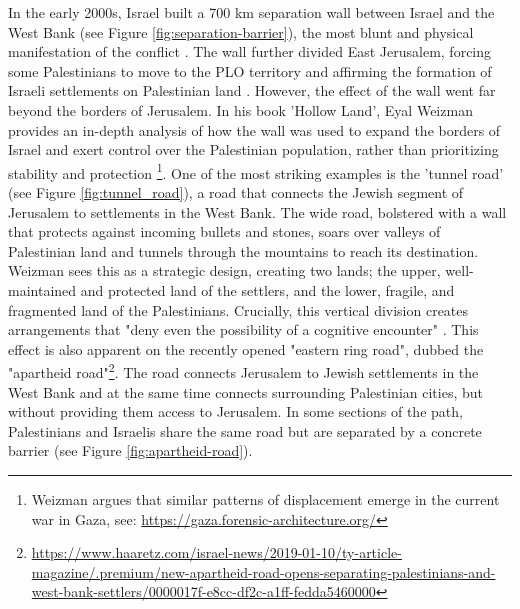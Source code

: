\documentclass[dissertation,math,vertlayout,pdfa,colorlinks,nologo]{aaltoseries}
\begin{document}
In the early 2000s, Israel built a 700 km separation wall between Israel and the West Bank (see Figure \ref{fig:separation-barrier}), the most blunt and physical manifestation of the conflict \cite{weizmanHollowLandIsraels2012}. The wall further divided East Jerusalem, forcing some Palestinians to move to the PLO territory and affirming the formation of Israeli settlements on Palestinian land \cite{kleinJerusalem2022}. However, the effect of the wall went far beyond the borders of Jerusalem. In his book 'Hollow Land', Eyal Weizman provides an in-depth analysis of how the wall was used to expand the borders of Israel and exert control over the Palestinian population, rather than prioritizing stability and protection \cite{weizmanHollowLandIsraels2012}\footnote{Weizman argues that similar patterns of displacement emerge in the current war in Gaza, see: \url{https://gaza.forensic-architecture.org/}}. One of the most striking examples is the 'tunnel road' \cite[p. 179]{weizmanHollowLandIsraels2012} (see Figure \ref{fig:tunnel_road}), a road that connects the Jewish segment of Jerusalem to settlements in the West Bank. The wide road, bolstered with a wall that protects against incoming bullets and stones, soars over valleys of Palestinian land and tunnels through the mountains to reach its destination. Weizman sees this as a strategic design, creating two lands; the upper, well-maintained and protected land of the settlers, and the lower, fragile, and fragmented land of the Palestinians. Crucially, this vertical division creates arrangements that "deny even the possibility of a cognitive encounter" \cite[p. 181]{weizmanHollowLandIsraels2012}. This effect is also apparent on the recently opened "eastern ring road", dubbed the "apartheid road"\footnote{\url{https://www.haaretz.com/israel-news/2019-01-10/ty-article-magazine/.premium/new-apartheid-road-opens-separating-palestinians-and-west-bank-settlers/0000017f-e8cc-df2c-a1ff-fedda5460000}}. The road connects Jerusalem to Jewish settlements in the West Bank and at the same time connects surrounding Palestinian cities, but without providing them access to Jerusalem. In some sections of the path, Palestinians and Israelis share the same road but are separated by a concrete barrier (see Figure \ref{fig:apartheid-road}).
\end{document}
